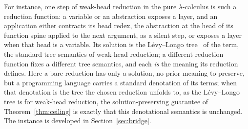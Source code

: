 For instance, one step of weak-head reduction in the pure $\lambda$-calculus is such a reduction function: a variable or an abstraction exposes a layer, and an application either contracts its head redex, the abstraction at the head of its function spine applied to the next argument, as a silent step, or exposes a layer when that head is a variable. Its solution is the L\'evy--Longo tree~\cite{longo1983-set-theoretical-models} of the term, the standard tree semantics of weak-head reduction; a different reduction function fixes a different tree semantics, and each \emph{is} the meaning its reduction defines. Here a bare reduction has only a solution, no prior meaning to preserve, but a programming language carries a standard denotation of its terms; when that denotation is the tree the chosen reduction unfolds to, as the L\'evy--Longo tree is for weak-head reduction, the solution-preserving guarantee of Theorem~\ref{thm:ceiling} is exactly that this denotational semantics is unchanged. The instance is developed in Section~\ref{sec:bridge}.


